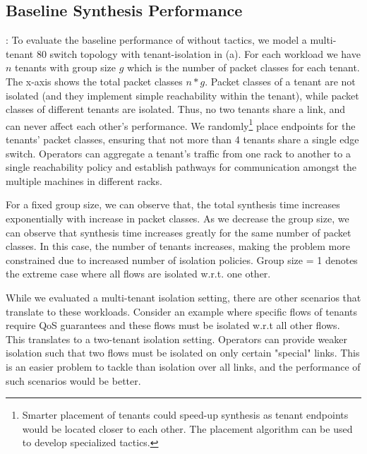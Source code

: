 \subsection{Baseline Synthesis Performance} \label{sec:baselineeval} 
: To evaluate the baseline
performance of \Name without tactics, we model a multi-tenant 80 switch
 topology with tenant-isolation in
(a).  For each workload we have $n$ tenants with
group size $g$ which is the number of packet classes for each
tenant. The x-axis shows the total packet classes $n*g$.  Packet
classes of a tenant are not isolated (and they implement simple
reachability within the tenant), while packet classes of different
tenants are isolated. Thus, no two tenants share a link, and can never
affect each other's performance.  We randomly\footnote{ Smarter
  placement of tenants could speed-up synthesis as tenant endpoints
  would be located closer to each other. The placement algorithm can
  be used to develop specialized tactics.}  place endpoints for the
tenants' packet classes, ensuring that not more than 4 tenants share a
single edge switch.  Operators can aggregate a tenant's traffic from
one rack to another to a single reachability policy and establish
pathways for communication amongst the multiple machines in different
racks.

For a fixed group size, we can observe that, the total synthesis time
increases exponentially with increase in packet classes.  As we
decrease the group size, we can observe that synthesis time increases
greatly for the same number of packet classes.  In this case, the
number of tenants increases, making the problem more constrained due
to increased number of isolation policies.  Group size = 1 denotes the
extreme case where all flows are isolated w.r.t. one other.
 
While we evaluated a multi-tenant isolation setting, there are other
scenarios that translate to these workloads. Consider an example where
specific flows of tenants require QoS guarantees and these flows must
be isolated w.r.t all other flows. This translates to a two-tenant
isolation setting. Operators can provide weaker isolation such that
two flows must be isolated on only certain "special" links. 
This is an easier problem to tackle than isolation over all
links, and the performance of such scenarios would be better.

